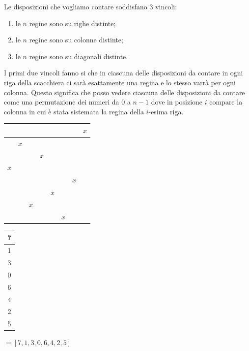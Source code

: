 Le disposizioni che vogliamo contare soddisfano 3 vincoli:
\begin{enumerate}
    \item le $n$ regine sono su righe distinte;
    \item le $n$ regine sono su colonne distinte;
    \item le $n$ regine sono su diagonali distinte.
\end{enumerate}
I primi due vincoli fanno si che in ciascuna delle disposizioni da contare in ogni riga della scacchiera ci sarà esattamente una regina e lo stesso varrà per ogni colonna. Questo significa che posso vedere ciascuna delle disposizioni da contare come una permutazione dei numeri da 0 a $n-1$ dove in posizione $i$ compare la colonna in cui è stata sistemata la regina della $i$-esima riga.
\begin{center}
\begin{tabular}{|c|c|c|c|c|c|c|c|}
    \hline
     &&&&&&&$x$\\\hline
     &$x$&&&&&&\\\hline
     &&&$x$&&&&\\\hline
     $x$&&&&&&&\\\hline
     &&&&&&$x$&\\\hline
     &&&&$x$&&&\\\hline
     &&$x$&&&&&\\\hline
     &&&&&$x$&&\\\hline
\end{tabular}\hspace{0.5cm}
\begin{tabular}{|c|}
    \hline
     7\\\hline
     1\\\hline
     3\\\hline
     0\\\hline
     6\\\hline
     4\\\hline
     2\\\hline
     5\\\hline
\end{tabular} $=[7, 1, 3, 0, 6, 4, 2, 5]$
\end{center}

